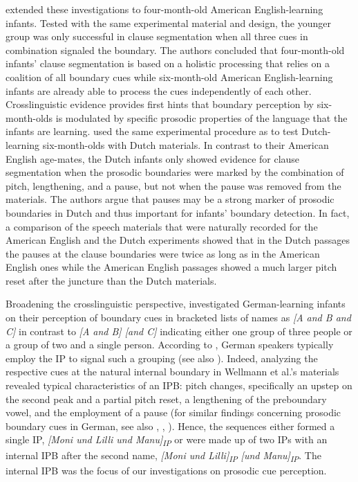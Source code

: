 \documentclass[output=paper]{langscibook}
\begin{document}
\citet{Seidl2008} extended these investigations to four-month-old American English-learning infants. Tested with the same experimental material and design, the younger group was only successful in clause segmentation when all three cues in combination signaled the boundary. The authors concluded that four-month-old infants’ clause segmentation is based on a holistic processing that relies on a coalition of all boundary cues while six-month-old American English-learning infants are already able to process the cues independently of each other.
Crosslinguistic evidence provides first hints that boundary perception by six-month-olds is modulated by specific prosodic properties of the language that the infants are learning. \citet{Johnson2008} used the same experimental procedure as \citet{Seidl2007} to test Dutch-learning six-month-olds with Dutch materials. In contrast to their American English age-mates, the Dutch infants only showed evidence for clause segmentation when the prosodic boundaries were marked by the combination of pitch, lengthening, and a pause, but not when the pause was removed from the materials. The authors argue that pauses may be a strong marker of prosodic boundaries in Dutch and thus important for infants’ boundary detection. In fact, a comparison of the speech materials that were naturally recorded for the American English and the Dutch experiments showed that in the Dutch passages the pauses at the clause boundaries were twice as long as in the American English ones while the American English passages showed a much larger pitch reset after the juncture than the Dutch materials.

Broadening the crosslinguistic perspective, \citet{Wellmann2012} investigated German-learning infants on their perception of boundary cues in bracketed lists of names as \textit{[A and B and C]} in contrast to \textit{[A and B] [and C]} indicating either one group of three people or a group of two and a single person. According to \citet{Petrone2017}, German speakers typically employ the IP to signal such a grouping (see also ). Indeed, analyzing the respective cues at the natural internal boundary in Wellmann et al.’s materials revealed typical characteristics of an IPB: pitch changes, specifically an upstep on the second peak and a partial pitch reset, a lengthening of the preboundary vowel, and the employment of a pause (for similar findings concerning prosodic boundary cues in German, see also \citealt{Fery2010}, , \citealt{Truckenbrodt2007a, Truckenbrodt2016}). Hence, the sequences either formed a single IP, \textit{[Moni und Lilli und Manu]\textsubscript{IP}} or were made up of two IPs with an internal IPB after the second name, \textit{[Moni und Lilli]\textsubscript{IP} [und Manu]\textsubscript{IP}}. The internal IPB was the focus of our investigations on prosodic cue perception.
\end{document}
